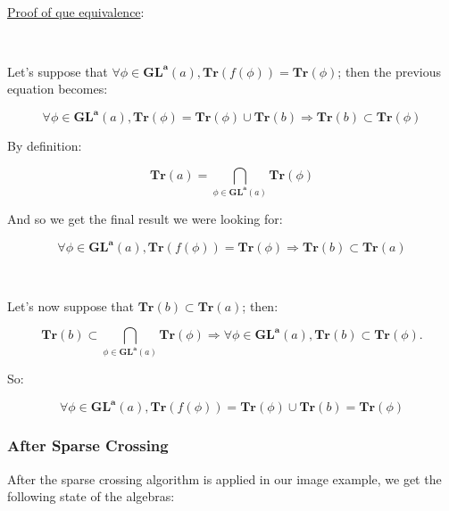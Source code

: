 \documentclass[a4paper, 11pt]{article}
\begin{document}
\

\noindent
\underline{Proof of que equivalence}:

\

Let's suppose that $\forall \phi \in \boldsymbol{GL}^{\boldsymbol{a}}(a), \textbf{Tr}(f(\phi)) = \textbf{Tr}(\phi)$; then the previous equation becomes:

\begin{equation*}
    \forall \phi \in \boldsymbol{GL}^{\boldsymbol{a}}(a), \textbf{Tr}(\phi) = \textbf{Tr}(\phi) \cup \textbf{Tr}(b) \Rightarrow \textbf{Tr}(b) \subset \textbf{Tr}(\phi) 
\end{equation*}

By definition:

\begin{equation*}
    \textbf{Tr}(a) = \bigcap_{\phi \in \boldsymbol{GL}^{\boldsymbol{a}}(a)} \textbf{Tr}(\phi)
\end{equation*}

And so we get the final result we were looking for:

\begin{equation*}
    \forall \phi \in \boldsymbol{GL}^{\boldsymbol{a}}(a), \textbf{Tr}(f(\phi)) = \textbf{Tr}(\phi) \Rightarrow \textbf{Tr}(b) \subset \textbf{Tr}(a)
\end{equation*}

\

Let's now suppose that $\textbf{Tr}(b) \subset \textbf{Tr}(a)$; then: 

\begin{equation*}
  \textbf{Tr}(b) \subset \bigcap_{\phi \in \boldsymbol{GL}^{\boldsymbol{a}}(a)} \textbf{Tr}(\phi) \Rightarrow \forall \phi \in \boldsymbol{GL}^{\boldsymbol{a}}(a), \textbf{Tr}(b) \subset \textbf{Tr}(\phi).  
\end{equation*}

So:

\begin{equation*}
    \forall \phi \in  \boldsymbol{GL}^{\boldsymbol{a}}(a), \textbf{Tr}(f(\phi)) = \textbf{Tr}(\phi) \cup \textbf{Tr}(b) = \textbf{Tr}(\phi)
\end{equation*}

\subsubsection{After Sparse Crossing}

After the sparse crossing algorithm is applied in our image example, we get the following state of the algebras:
\end{document}
